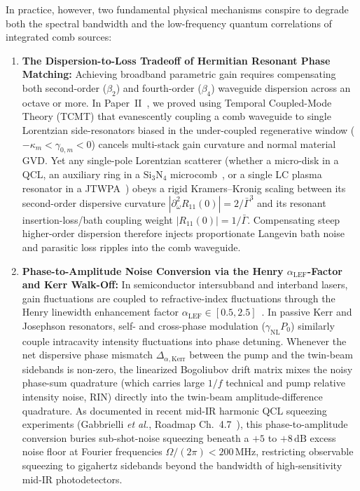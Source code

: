 \documentclass[11pt,letterpaper]{article}
\theoremstyle{definition}
\theoremstyle{remark}
\begin{document}
In practice, however, two fundamental physical mechanisms conspire to degrade both the spectral bandwidth and the low-frequency quantum correlations of integrated comb sources:
\begin{enumerate}
    \item \textbf{The Dispersion-to-Loss Tradeoff of Hermitian Resonant Phase Matching:} Achieving broadband parametric gain requires compensating both second-order ($\beta_2$) and fourth-order ($\beta_4$) waveguide dispersion across an octave or more. In Paper~II~\cite{OwnbyPaperII2026}, we proved using Temporal Coupled-Mode Theory (TCMT) that evanescently coupling a comb waveguide to single Lorentzian side-resonators biased in the under-coupled regenerative window ($-\kappa_m < \gamma_{0,m} < 0$) cancels multi-stack gain curvature and normal material GVD. Yet any single-pole Lorentzian scatterer (whether a micro-disk in a QCL, an auxiliary ring in a $\mathrm{Si_3N_4}$ microcomb~\cite{Xue2015}, or a single LC plasma resonator in a JTWPA~\cite{Macklin2015}) obeys a rigid Kramers--Kronig scaling between its second-order dispersive curvature $|\partial_\omega^2 R_{11}(0)| = 2/\bar{\Gamma}^3$ and its resonant insertion-loss/bath coupling weight $|R_{11}(0)| = 1/\bar{\Gamma}$. Compensating steep higher-order dispersion therefore injects proportionate Langevin bath noise and parasitic loss ripples into the comb waveguide.
    \item \textbf{Phase-to-Amplitude Noise Conversion via the Henry $\alpha_{\mathrm{LEF}}$-Factor and Kerr Walk-Off:} In semiconductor intersubband and interband lasers, gain fluctuations are coupled to refractive-index fluctuations through the Henry linewidth enhancement factor $\alpha_{\mathrm{LEF}} \in [0.5, 2.5]$~\cite{Vurgaftman2021,Ohtsubo2012,SilvestriRoadmap2025}. In passive Kerr and Josephson resonators, self- and cross-phase modulation ($\gamma_{\mathrm{NL}}P_0$) similarly couple intracavity intensity fluctuations into phase detuning. Whenever the net dispersive phase mismatch $\Delta_{\alpha,\mathrm{Kerr}}$ between the pump and the twin-beam sidebands is non-zero, the linearized Bogoliubov drift matrix mixes the noisy phase-sum quadrature (which carries large $1/f$ technical and pump relative intensity noise, RIN) directly into the twin-beam amplitude-difference quadrature. As documented in recent mid-IR harmonic QCL squeezing experiments (Gabbrielli \textit{et al.}, Roadmap Ch.~4.7~\cite{GabbrielliRoadmap2025}), this phase-to-amplitude conversion buries sub-shot-noise squeezing beneath a $+5$ to $+8\,\mathrm{dB}$ excess noise floor at Fourier frequencies $\Omega/(2\pi) < 200\,\mathrm{MHz}$, restricting observable squeezing to gigahertz sidebands beyond the bandwidth of high-sensitivity mid-IR photodetectors.
\end{enumerate}
\end{document}
